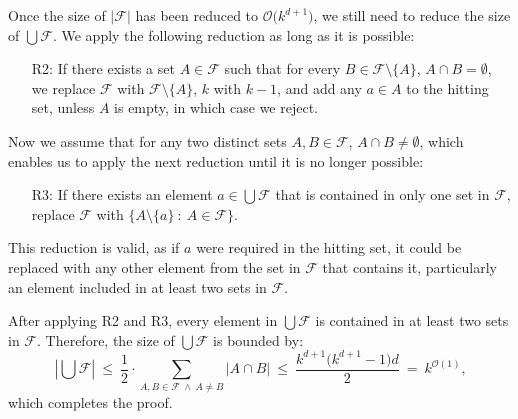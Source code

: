 \documentclass[12pt]{article}
\begin{document}
	\medskip
	
	Once the size of \(|\mathcal{F}|\) has been reduced to
	\(\mathcal{O}\big(k^{d + 1}\big)\), we still need to reduce the size of
	\(\bigcup \mathcal{F}\). We apply the following reduction as long as it is
	possible:
	\begin{itemize}
		\item[R2:] If there exists a set \(A \in \mathcal{F}\) such that for
		           every \(B \in \mathcal{F} \setminus \{A\}\), \(A \cap B =
		           \emptyset\), we replace \(\mathcal{F}\) with \(\mathcal{F}
		           \setminus \{A\}\), \(k\) with \(k - 1\), and add any \(a \in
		           A\) to the hitting set, unless \(A\) is empty, in which case
		           we reject.
	\end{itemize}
	Now we assume that for any two distinct sets \(A, B \in \mathcal{F}\), \(A
	\cap B \neq \emptyset\), which enables us to apply the next reduction until
	it is no longer possible:
	\begin{itemize}
		\item[R3:] If there exists an element \(a \in \bigcup \mathcal{F}\) that
		           is contained in only one set in \(\mathcal{F}\), replace
		           \(\mathcal{F}\) with \(\{A \setminus \{a\} \ : \ A \in
		           \mathcal{F}\}\).
	\end{itemize}
	This reduction is valid, as if \(a\) were required in the hitting set, it
	could be replaced with any other element from the set in \(\mathcal{F}\)
	that contains it, particularly an element included in at least two sets in
	\(\mathcal{F}\).
	
	\medskip
	
	After applying R2 and R3, every element in \(\bigcup \mathcal{F}\) is
	contained in at least two sets in \(\mathcal{F}\). Therefore, the size of
	\(\bigcup \mathcal{F}\) is bounded by:
	\[ \left| \bigcup \mathcal{F} \right| \ \leqslant \ \frac{1}{2} \cdot
	\sum\limits_{A, B \in \mathcal{F} \ \wedge \ A \neq B} |A \cap B| \
	\leqslant \ \frac{k^{d + 1} \big(k^{d + 1} - 1\big)d}{2} \ = \
	k^{\mathcal{O}(1)} \text{,} \]
	which completes the proof.
\end{document}
